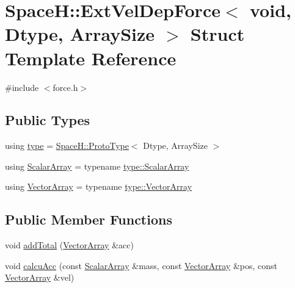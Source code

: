 \hypertarget{struct_space_h_1_1_ext_vel_dep_force_3_01void_00_01_dtype_00_01_array_size_01_4}{}\section{SpaceH\+:\+:Ext\+Vel\+Dep\+Force$<$ void, Dtype, Array\+Size $>$ Struct Template Reference}
\label{struct_space_h_1_1_ext_vel_dep_force_3_01void_00_01_dtype_00_01_array_size_01_4}


{\ttfamily \#include $<$force.\+h$>$}

\subsection*{Public Types}
\begin{DoxyCompactItemize}
\item 
using \mbox{\hyperlink{struct_space_h_1_1_ext_vel_dep_force_3_01void_00_01_dtype_00_01_array_size_01_4_a6f1a7483c68f9269a6313400c93e774a}{type}} = \mbox{\hyperlink{struct_space_h_1_1_proto_type}{Space\+H\+::\+Proto\+Type}}$<$ Dtype, Array\+Size $>$
\item 
using \mbox{\hyperlink{struct_space_h_1_1_ext_vel_dep_force_3_01void_00_01_dtype_00_01_array_size_01_4_aff7fedbfa20cab198234cc35a922fa1f}{Scalar\+Array}} = typename \mbox{\hyperlink{struct_space_h_1_1_proto_type_a09ef91dc8a37a044c403f5a833044725}{type\+::\+Scalar\+Array}}
\item 
using \mbox{\hyperlink{struct_space_h_1_1_ext_vel_dep_force_3_01void_00_01_dtype_00_01_array_size_01_4_a606b1df4989b62f06775a825c0f8e483}{Vector\+Array}} = typename \mbox{\hyperlink{struct_space_h_1_1_proto_type_a622b8e122b33bb4966a02299fb7b82d6}{type\+::\+Vector\+Array}}
\end{DoxyCompactItemize}
\subsection*{Public Member Functions}
\begin{DoxyCompactItemize}
\item 
void \mbox{\hyperlink{struct_space_h_1_1_ext_vel_dep_force_3_01void_00_01_dtype_00_01_array_size_01_4_ace1007ee6131097df834217979940cbb}{add\+Total}} (\mbox{\hyperlink{struct_space_h_1_1_ext_vel_dep_force_3_01void_00_01_dtype_00_01_array_size_01_4_a606b1df4989b62f06775a825c0f8e483}{Vector\+Array}} \&acc)
\item 
void \mbox{\hyperlink{struct_space_h_1_1_ext_vel_dep_force_3_01void_00_01_dtype_00_01_array_size_01_4_ab1ab7d0fa69ef28c8ec05ce5673d3373}{calcu\+Acc}} (const \mbox{\hyperlink{struct_space_h_1_1_ext_vel_dep_force_3_01void_00_01_dtype_00_01_array_size_01_4_aff7fedbfa20cab198234cc35a922fa1f}{Scalar\+Array}} \&mass, const \mbox{\hyperlink{struct_space_h_1_1_ext_vel_dep_force_3_01void_00_01_dtype_00_01_array_size_01_4_a606b1df4989b62f06775a825c0f8e483}{Vector\+Array}} \&pos, const \mbox{\hyperlink{struct_space_h_1_1_ext_vel_dep_force_3_01void_00_01_dtype_00_01_array_size_01_4_a606b1df4989b62f06775a825c0f8e483}{Vector\+Array}} \&vel)
\end{DoxyCompactItemize}


